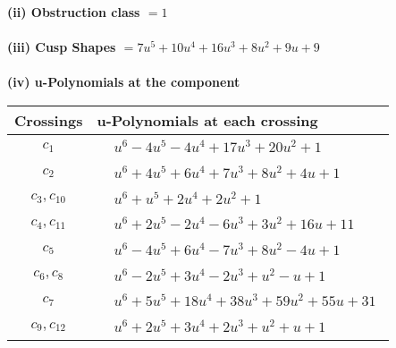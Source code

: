 \documentclass[1p]{elsarticle_modified}
\theoremstyle{definition}
\begin{document}
\flushleft \textbf{(ii) Obstruction class $= 1$}\\~\\
\flushleft \textbf{(iii) Cusp Shapes $= 7 u^5+10 u^4+16 u^3+8 u^2+9 u+9$}\\~\\
\newpage\renewcommand{\arraystretch}{1}
\flushleft \textbf{(iv) u-Polynomials at the component}\newline \\
\begin{tabular}{m{50pt}|m{274pt}}
Crossings & \hspace{64pt}u-Polynomials at each crossing \\
\hline $$\begin{aligned}c_{1}\end{aligned}$$&$\begin{aligned}
&u^6-4 u^5-4 u^4+17 u^3+20 u^2+1
\end{aligned}$\\
\hline $$\begin{aligned}c_{2}\end{aligned}$$&$\begin{aligned}
&u^6+4 u^5+6 u^4+7 u^3+8 u^2+4 u+1
\end{aligned}$\\
\hline $$\begin{aligned}c_{3},c_{10}\end{aligned}$$&$\begin{aligned}
&u^6+u^5+2 u^4+2 u^2+1
\end{aligned}$\\
\hline $$\begin{aligned}c_{4},c_{11}\end{aligned}$$&$\begin{aligned}
&u^6+2 u^5-2 u^4-6 u^3+3 u^2+16 u+11
\end{aligned}$\\
\hline $$\begin{aligned}c_{5}\end{aligned}$$&$\begin{aligned}
&u^6-4 u^5+6 u^4-7 u^3+8 u^2-4 u+1
\end{aligned}$\\
\hline $$\begin{aligned}c_{6},c_{8}\end{aligned}$$&$\begin{aligned}
&u^6-2 u^5+3 u^4-2 u^3+u^2- u+1
\end{aligned}$\\
\hline $$\begin{aligned}c_{7}\end{aligned}$$&$\begin{aligned}
&u^6+5 u^5+18 u^4+38 u^3+59 u^2+55 u+31
\end{aligned}$\\
\hline $$\begin{aligned}c_{9},c_{12}\end{aligned}$$&$\begin{aligned}
&u^6+2 u^5+3 u^4+2 u^3+u^2+u+1
\end{aligned}$\\
\hline
\end{tabular}\\~\\
\end{document}
